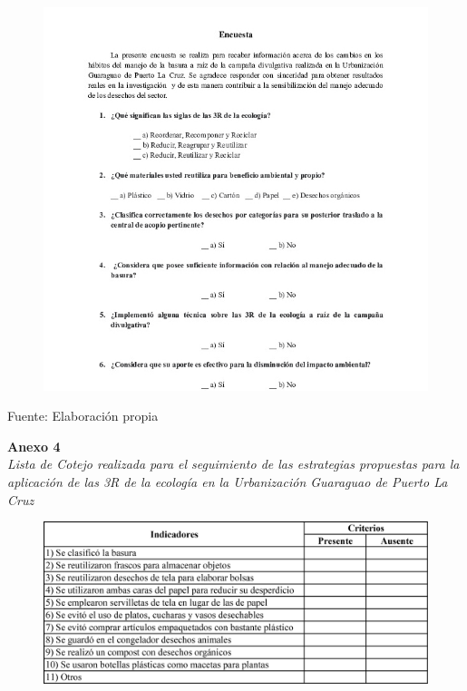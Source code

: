 \begin{figure}[!ht]
    \centering
    \includegraphics[width=15cm]{Media/Encuesta 2.jpg}
    \label{fig:encuesta2}
\end{figure}

\setlength{\parindent}{0ex}

Fuente: Elaboración propia

\newpage

\textbf{Anexo 4} \\
\textit{Lista de Cotejo realizada para el seguimiento de las estrategias propuestas para la aplicación de las 3R de la ecología en la Urbanización Guaraguao de Puerto La Cruz}

\begin{figure}[!ht]
    \centering
    \includegraphics[width=15cm]{Media/lista de cotejo.png}
    \label{fig:ListadeCotejo}
\end{figure}


